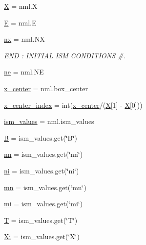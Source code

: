 \begin{DoxyCompactItemize}
\item 
\hyperlink{namespacesetup__diff_ad01f7c1ee607d8a67926e30be25385f1}{X} = nml.\+X
\item 
\hyperlink{namespacesetup__diff_aa5cb1501a25fe4b39a92f30f468e71e8}{E} = nml.\+E
\item 
\hyperlink{namespacesetup__diff_a84c2e8dbad4841a4d80d07795fd2c871}{nx} = nml.\+NX
\begin{DoxyCompactList}\small\item\em E\+ND \+: I\+N\+I\+T\+I\+AL I\+SM C\+O\+N\+D\+I\+T\+I\+O\+NS \#. \end{DoxyCompactList}\item 
\hyperlink{namespacesetup__diff_a7377194d428b3a98905f3fb8da5f806e}{ne} = nml.\+NE
\item 
\hyperlink{namespacesetup__diff_a644659f9e800f2cfde1ba2f023a7467b}{x\+\_\+center} = nml.\+box\+\_\+center
\item 
\hyperlink{namespacesetup__diff_af0fa7fe4226cbec9f01082f4f123749e}{x\+\_\+center\+\_\+index} = int(\hyperlink{namespacesetup__diff_a644659f9e800f2cfde1ba2f023a7467b}{x\+\_\+center}/(\hyperlink{namespacesetup__diff_ad01f7c1ee607d8a67926e30be25385f1}{X}\mbox{[}1\mbox{]} -\/ \hyperlink{namespacesetup__diff_ad01f7c1ee607d8a67926e30be25385f1}{X}\mbox{[}0\mbox{]}))
\item 
\hyperlink{namespacesetup__diff_ab3947b633ff67f978f2d8b2a29b0ac3a}{ism\+\_\+values} = nml.\+ism\+\_\+values
\item 
\hyperlink{namespacesetup__diff_a3ff0214b9ccbb5d3effc3a395ed0b7cf}{B} = ism\+\_\+values.\+get(\char`\"{}B\char`\"{})
\item 
\hyperlink{namespacesetup__diff_a37f647df319f5ccac855e6c8a47987cd}{nn} = ism\+\_\+values.\+get(\char`\"{}nn\char`\"{})
\item 
\hyperlink{namespacesetup__diff_a7c4bbab49b0f42b0856eab0c1fc53ce4}{ni} = ism\+\_\+values.\+get(\char`\"{}ni\char`\"{})
\item 
\hyperlink{namespacesetup__diff_aa4851de6bb5e61a167eebb694c0215f6}{mn} = ism\+\_\+values.\+get(\char`\"{}mn\char`\"{})
\item 
\hyperlink{namespacesetup__diff_ae7737ec2690a72a465f5de135c5c5cc3}{mi} = ism\+\_\+values.\+get(\char`\"{}mi\char`\"{})
\item 
\hyperlink{namespacesetup__diff_a5476c880f474eb8d08fe960274345405}{T} = ism\+\_\+values.\+get(\char`\"{}T\char`\"{})
\item 
\hyperlink{namespacesetup__diff_ac53a4b18f3e357986771793bfebb4ed7}{Xi} = ism\+\_\+values.\+get(\char`\"{}X\char`\"{})

\end{DoxyCompactItemize}
